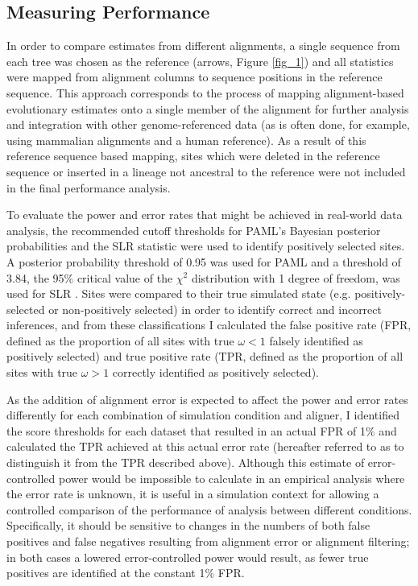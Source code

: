 \subsection{Measuring Performance}

In order to compare \sw estimates from different alignments, a single
sequence from each tree was chosen as the reference (arrows, Figure
\ref{fig_1}) and all \sw statistics were mapped from alignment columns
to sequence positions in the reference sequence. This approach
corresponds to the process of mapping alignment-based evolutionary
estimates onto a single member of the alignment for further analysis
and integration with other genome-referenced data (as is often done,
for example, using mammalian alignments and a human reference). As a
result of this reference sequence based mapping, sites which were
deleted in the reference sequence or inserted in a lineage not
ancestral to the reference were not included in the final performance
analysis.

To evaluate the power and error rates that might be achieved in
real-world data analysis, the recommended cutoff thresholds for PAML's
Bayesian posterior probabilities and the SLR statistic were used to
identify positively selected sites. A posterior probability threshold
of 0.95 was used for PAML \citep{Yang2005Bayes} and a threshold of 3.84,
the 95\% critical value of the $\chi^2$ distribution with 1 degree
of freedom, was used for SLR \citep{Massingham2005}. Sites were
compared to their true simulated state (e.g. positively-selected or
non-positively selected) in order to identify correct and incorrect
inferences, and from these classifications I calculated the false
positive rate (FPR, defined as the proportion of all sites with true
$\omega<1$ falsely identified as positively selected) and true positive rate
(TPR, defined as the proportion of all sites with true $\omega>1$ correctly
identified as positively selected).

As the addition of alignment error is expected to affect the power and
error rates differently for each combination of simulation condition
and aligner, I identified the score thresholds for each dataset that
resulted in an actual FPR of 1\% and calculated the TPR achieved at
this actual error rate (hereafter referred to as \tpr{} to distinguish
it from the TPR described above). Although this estimate of
error-controlled power would be impossible to calculate in an
empirical analysis where the error rate is unknown, it is useful in a
simulation context for allowing a controlled comparison of the
performance of \sw analysis between different
conditions. Specifically, it should be sensitive to changes in the
numbers of both false positives and false negatives resulting from
alignment error or alignment filtering; in both cases a lowered
error-controlled power would result, as fewer true positives are
identified at the constant 1\% FPR.

